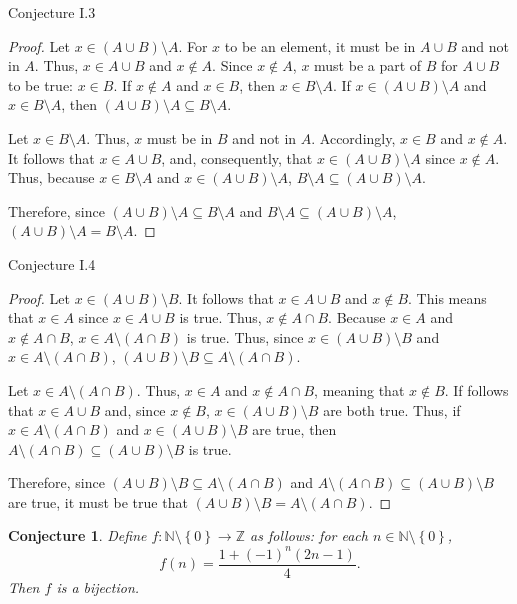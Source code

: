 \documentclass[11pt,titlepage]{article}		%
\newcommand{\set}[1]{\left\{ {#1} \right\}}
\def\Z{{\mathbb Z}}
\def\N{{\mathbb N}}
\theoremstyle{theorem}
\newtheorem{conjecture}[theorem]{Conjecture}
\begin{document}
Conjecture I.3
\begin{proof}
Let $x\in (A \cup B)\setminus A$. For $x$ to be an element, it must be in $A\cup B$ and not in $A$. Thus, $x\in A\cup B$ and $x\not\in A$. Since $x\not\in A$, $x$ must be a part of $B$ for $A\cup B$ to be true: $x\in B$. If $x\not\in A$ and $x\in B$, then $x\in B\setminus A$. If $x\in (A \cup B)\setminus A$ and $x\in B\setminus A$, then $(A \cup B)\setminus A \subseteq B \setminus A$.

Let $x\in B\setminus A$. Thus, $x$ must be in $B$ and not in $A$. Accordingly, $x\in B$ and $x\not\in A$. It follows that $x \in A\cup B$, and, consequently, that $x \in (A \cup B)\setminus A$ since $x \not \in A$. Thus, because $x\in B \setminus A$ and $x \in (A \cup B)\setminus A$, $B\setminus A \subseteq (A\cup B)\setminus A$.

Therefore, since $(A \cup B)\setminus A \subseteq B \setminus A$ and $B\setminus A \subseteq (A\cup B)\setminus A$, $(A \cup B)\setminus A = B \setminus A$.
\end{proof}

Conjecture I.4
\begin{proof}
Let $x \in (A \cup B) \setminus B$. It follows that $x \in A\cup B$ and $x\not\in B$. This means that $x\in A$ since $x\in A\cup B$ is true. Thus, $x\not\in A\cap B$. Because $x\in A$ and $x\not\in A \cap B$, $x\in A\setminus (A\cap B)$ is true. Thus, since $x\in (A \cup B) \setminus B$ and $x\in A\setminus (A\cap B)$, $ (A\cup B) \setminus B \subseteq A\setminus (A \cap B)$.

Let $x \in A\setminus(A\cap B)$. Thus, $x \in A$ and $x \not \in A \cap B$, meaning that $x \not\in B$. If follows that $x \in A \cup B$ and, since $x \not \in B$, $ x\in (A \cup B)\setminus B$ are both true. Thus, if $x \in A\setminus(A\cap B)$ and $ x\in (A \cup B)\setminus B$ are true, then $A\setminus(A\cap B) \subseteq (A \cup B)\setminus B$ is true.

Therefore, since $ (A\cup B) \setminus B \subseteq A\setminus (A \cap B)$ and $A\setminus(A\cap B) \subseteq (A \cup B)\setminus B$ are true, it must be true that $ (A\cup B) \setminus B = A\setminus (A \cap B)$.
\end{proof}

\clearpage
\begin{conjecture}
Define $f: \N\setminus\set{0}\to\Z$ as follows: for each $n\in \N\setminus \set{0}$,
\[
f(n) = \frac{1+(-1)^n (2n-1)}{4}.
\]
Then $f$ is a bijection.
\end{conjecture}
\end{document}
